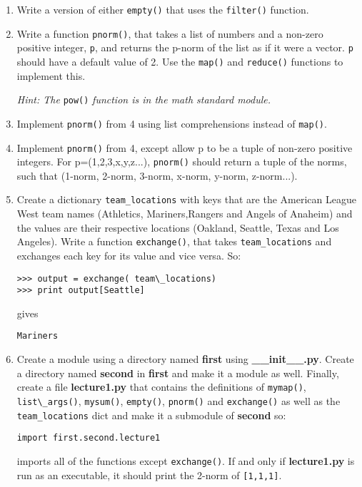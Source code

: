 \documentclass{report}
\begin{document}
\begin{enumerate}
	\item Write a version of either \verb|empty()| that uses the \verb|filter()| function.

	\item Write a function \verb|pnorm()|, that takes a list of numbers and a non-zero positive integer, \verb|p|, and returns the p-norm of the list as if it were a vector. \verb|p| should have a default value of 2. Use the \verb|map()| and \verb|reduce()| functions to implement this.

\emph{Hint: The }\verb|pow()| \emph{function is in the math standard module.}

	\item Implement \verb|pnorm()| from 4 using list comprehensions instead of \verb|map()|.

	\item Implement \verb|pnorm()| from 4, except allow p to be a tuple of non-zero positive integers. For p=(1,2,3,x,y,z...), \verb|pnorm()| should return a tuple of the norms, such that (1-norm, 2-norm, 3-norm, x-norm, y-norm, z-norm...).

	\item Create a dictionary \verb|team_locations| with keys that are the American League West team names (Athletics, Mariners,Rangers and Angels of Anaheim) and the values are their respective locations (Oakland, Seattle, Texas and Los Angeles). Write a function \verb|exchange()|, that takes \verb|team_locations| and exchanges each key for its value and vice versa. So:

\begin{verbatim}
>>> output = exchange( team\_locations)
>>> print output[Seattle]
\end{verbatim}
gives

\verb|Mariners|
	

	\item Create a module using a directory named \textbf{first} using \textbf{\_\_init\_\_.py}. Create a directory named \textbf{second} in \textbf{first} and make it a module as well. Finally, create a file \textbf{lecture1.py} that contains the definitions of \verb|mymap()|, \verb|list\_args()|, \verb|mysum()|, \verb|empty()|, \verb|pnorm()| and \verb|exchange()| as well as the \verb|team_locations| dict and make it a submodule of \textbf{second} so:

\verb|import first.second.lecture1|

imports all of the functions except \verb|exchange()|. If and only if \textbf{lecture1.py} is run as an executable, it should print the 2-norm of \verb|[1,1,1]|.

\end{enumerate}
\end{document}
